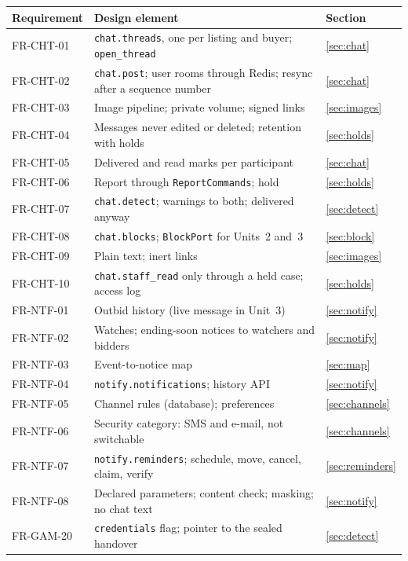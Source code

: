 \documentclass[11pt,a4paper]{article}
\begin{document}
{\small\begin{longtable}{@{}>{\ttfamily}p{2.4cm}>{\raggedright\arraybackslash}p{10.6cm}>{\raggedright\arraybackslash}p{2.2cm}@{}}
\toprule \textnormal{\textbf{Requirement}} & \textbf{Design element} & \textbf{Section} \\ \midrule \endhead
FR-CHT-01 & \texttt{chat.threads}, one per listing and buyer; \texttt{open\_thread} & \ref{sec:chat} \\
FR-CHT-02 & \texttt{chat.post}; user rooms through Redis; resync after a sequence number & \ref{sec:chat} \\
FR-CHT-03 & Image pipeline; private volume; signed links & \ref{sec:images} \\
FR-CHT-04 & Messages never edited or deleted; retention with holds & \ref{sec:holds} \\
FR-CHT-05 & Delivered and read marks per participant & \ref{sec:chat} \\
FR-CHT-06 & Report through \texttt{ReportCommands}; hold & \ref{sec:holds} \\
FR-CHT-07 & \texttt{chat.detect}; warnings to both; delivered anyway & \ref{sec:detect} \\
FR-CHT-08 & \texttt{chat.blocks}; \texttt{BlockPort} for Units~2 and~3 & \ref{sec:block} \\
FR-CHT-09 & Plain text; inert links & \ref{sec:images} \\
FR-CHT-10 & \texttt{chat.staff\_read} only through a held case; access log & \ref{sec:holds} \\
FR-NTF-01 & Outbid history (live message in Unit~3) & \ref{sec:notify} \\
FR-NTF-02 & Watches; ending-soon notices to watchers and bidders & \ref{sec:notify} \\
FR-NTF-03 & Event-to-notice map & \ref{sec:map} \\
FR-NTF-04 & \texttt{notify.notifications}; history API & \ref{sec:notify} \\
FR-NTF-05 & Channel rules (database); preferences & \ref{sec:channels} \\
FR-NTF-06 & Security category: SMS and e-mail, not switchable & \ref{sec:channels} \\
FR-NTF-07 & \texttt{notify.reminders}; schedule, move, cancel, claim, verify & \ref{sec:reminders} \\
FR-NTF-08 & Declared parameters; content check; masking; no chat text & \ref{sec:notify} \\
FR-GAM-20 & \texttt{credentials} flag; pointer to the sealed handover & \ref{sec:detect} \\

\end{longtable}}
\end{document}
